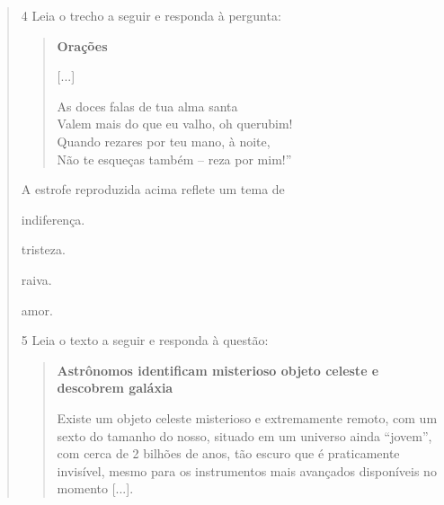 \begin{quote}
\num{4} Leia o trecho a seguir e responda à pergunta:

\begin{quote}
\textbf{Orações}

{[}...{]}

As doces falas de tua alma santa\\
Valem mais do que eu valho, oh querubim!\\
Quando rezares por teu mano, à noite,\\
Não te esqueças também -- reza por mim!''

\end{quote}

A estrofe reproduzida acima reflete um tema de

\begin{escolha}
\item indiferença.

\item tristeza.

\item raiva.

\item amor.
\end{escolha}


\num{5} Leia o texto a seguir e responda à questão:

\begin{quote}
\textbf{Astrônomos identificam misterioso objeto celeste e descobrem
galáxia}

Existe um objeto celeste misterioso e extremamente remoto, com um
sexto do tamanho do nosso, situado em um universo ainda ``jovem'', com
cerca de 2 bilhões de anos, tão escuro que é praticamente invisível,
mesmo para os instrumentos mais avançados disponíveis no momento
{[}...{]}.


\end{quote}
\end{quote}
